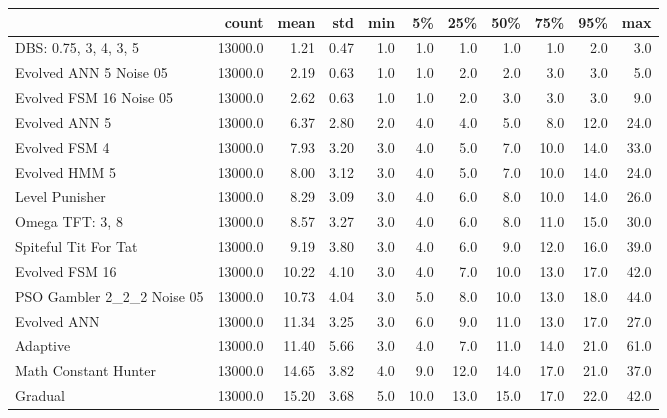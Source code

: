 \begin{tabular}{lrrrrrrrrrr}
\toprule
{} &    count &   mean &   std &  min &    5\% &   25\% &   50\% &   75\% &   95\% &   max \\
\midrule
DBS: 0.75, 3, 4, 3, 5      &  13000.0 &   1.21 &  0.47 &  1.0 &   1.0 &   1.0 &   1.0 &   1.0 &   2.0 &   3.0 \\
Evolved ANN 5 Noise 05     &  13000.0 &   2.19 &  0.63 &  1.0 &   1.0 &   2.0 &   2.0 &   3.0 &   3.0 &   5.0 \\
Evolved FSM 16 Noise 05    &  13000.0 &   2.62 &  0.63 &  1.0 &   1.0 &   2.0 &   3.0 &   3.0 &   3.0 &   9.0 \\
Evolved ANN 5              &  13000.0 &   6.37 &  2.80 &  2.0 &   4.0 &   4.0 &   5.0 &   8.0 &  12.0 &  24.0 \\
Evolved FSM 4              &  13000.0 &   7.93 &  3.20 &  3.0 &   4.0 &   5.0 &   7.0 &  10.0 &  14.0 &  33.0 \\
Evolved HMM 5              &  13000.0 &   8.00 &  3.12 &  3.0 &   4.0 &   5.0 &   7.0 &  10.0 &  14.0 &  24.0 \\
Level Punisher             &  13000.0 &   8.29 &  3.09 &  3.0 &   4.0 &   6.0 &   8.0 &  10.0 &  14.0 &  26.0 \\
Omega TFT: 3, 8            &  13000.0 &   8.57 &  3.27 &  3.0 &   4.0 &   6.0 &   8.0 &  11.0 &  15.0 &  30.0 \\
Spiteful Tit For Tat       &  13000.0 &   9.19 &  3.80 &  3.0 &   4.0 &   6.0 &   9.0 &  12.0 &  16.0 &  39.0 \\
Evolved FSM 16             &  13000.0 &  10.22 &  4.10 &  3.0 &   4.0 &   7.0 &  10.0 &  13.0 &  17.0 &  42.0 \\
PSO Gambler 2\_2\_2 Noise 05 &  13000.0 &  10.73 &  4.04 &  3.0 &   5.0 &   8.0 &  10.0 &  13.0 &  18.0 &  44.0 \\
Evolved ANN                &  13000.0 &  11.34 &  3.25 &  3.0 &   6.0 &   9.0 &  11.0 &  13.0 &  17.0 &  27.0 \\
Adaptive                   &  13000.0 &  11.40 &  5.66 &  3.0 &   4.0 &   7.0 &  11.0 &  14.0 &  21.0 &  61.0 \\
Math Constant Hunter       &  13000.0 &  14.65 &  3.82 &  4.0 &   9.0 &  12.0 &  14.0 &  17.0 &  21.0 &  37.0 \\
Gradual                    &  13000.0 &  15.20 &  3.68 &  5.0 &  10.0 &  13.0 &  15.0 &  17.0 &  22.0 &  42.0 \\
\bottomrule
\end{tabular}
